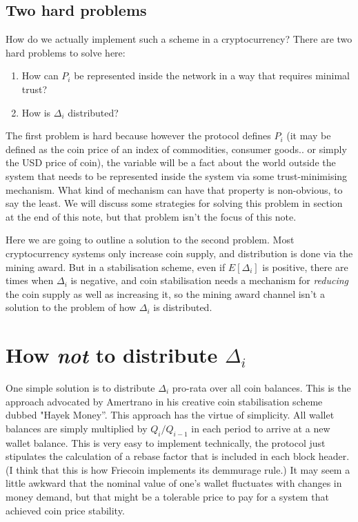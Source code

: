 \documentclass[twocolumn]{article}
\begin{document}
\subsection*{Two hard problems}
How do we actually implement such a scheme in a cryptocurrency? There
are two hard problems to solve here:
\begin{enumerate}
\item How can $P_{i}$ be represented inside the network in a way that
  requires minimal trust?
\item How is $\Delta_{i}$ distributed? 
\end{enumerate}
The first problem is hard because however the protocol defines $P_{i}$
(it may be defined as the coin price of an index of commodities,
consumer goods.. or simply the USD price of coin), the variable will
be a fact about the world outside the system that needs to be
represented inside the system via some trust-minimising
mechanism. What kind of mechanism can have that property is
non-obvious, to say the least. We will discuss some strategies for
solving this problem in section at the end of this note, but that
problem isn't the focus of this note.

Here we are going to outline a solution to the second problem. Most
cryptocurrency systems only increase coin supply, and distribution is
done via the mining award. But in a stabilisation scheme, even if
$E[\Delta_{i}]$ is positive, there are times when $\Delta_{i}$ is
negative, and coin stabilisation needs a mechanism for \emph{reducing}
the coin supply as well as increasing it, so the mining award channel
isn't a solution to the problem of how $\Delta_{i}$ is distributed.

\section*{How \emph{not} to distribute $\Delta_{i}$}
One simple solution is to distribute $\Delta_{i}$ pro-rata over all
coin balances. This is the approach advocated by Amertrano in his
creative coin stabilisation scheme dubbed "Hayek
Money''\cite{amertrano}. This approach has the virtue of
simplicity. All wallet balances are simply multiplied by $Q_{i} /
Q_{i-1}$ in each period to arrive at a new wallet balance. This is
very easy to implement technically, the protocol just stipulates the
calculation of a rebase factor that is included in each block
header. (I think that this is how Friecoin implements its demmurage
rule.) It may seem a little awkward that the nominal value of one's
wallet fluctuates with changes in money demand, but that might be a
tolerable price to pay for a system that achieved coin price stability.
\end{document}
